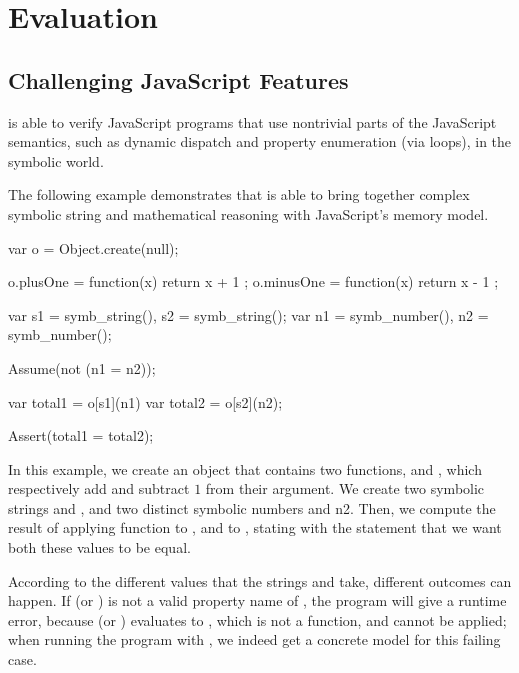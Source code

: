 

\section{Evaluation}

\subsection{Challenging JavaScript Features}

\cosette is able to verify JavaScript programs that use nontrivial parts of the JavaScript semantics, such as dynamic dispatch and property enumeration (via  loops), in the symbolic world.

The following example demonstrates that \cosette is able to bring together complex symbolic string and mathematical reasoning with JavaScript's memory model.

\begin{lstjshere}
var o = Object.create(null);

o.plusOne = function(x) { return x + 1 };
o.minusOne = function(x) { return x - 1 };

var s1 = symb_string(), s2 = symb_string();
var n1 = symb_number(), n2 = symb_number();

Assume(not (n1 = n2));

var total1 = o[s1](n1)
var total2 = o[s2](n2);

Assert(total1 = total2);
\end{lstjshere}

In this example, we create an object  that contains two functions,  and , which respectively add and subtract $1$ from their argument.
We create two symbolic strings  and , and two distinct symbolic numbers  and {n2}.
Then, we compute the result of applying function  to , and  to , stating with the  statement that we want both these values to be equal.

According to the different values that the strings  and  take,  different outcomes can happen.
If  (or ) is not a valid property name of , the program will give a runtime error, because  (or ) evaluates to , which is not a function, and cannot be applied; when running the program with \cosette, we indeed get a concrete model for this failing case.

